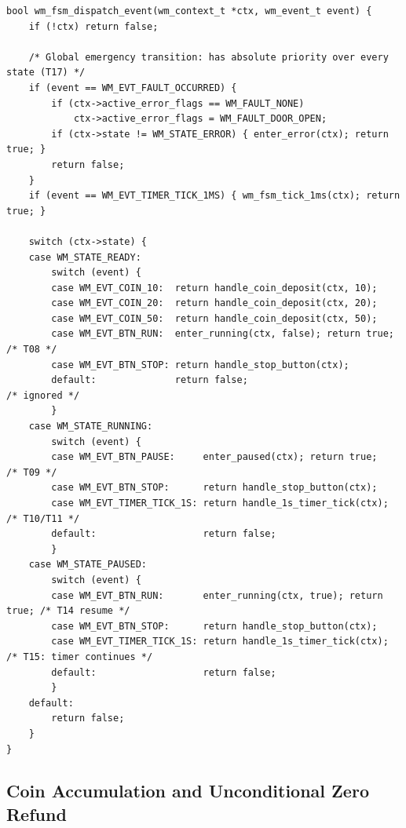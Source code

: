 \begin{lstlisting}[caption={Deterministic event dispatcher implementation}]
bool wm_fsm_dispatch_event(wm_context_t *ctx, wm_event_t event) {
    if (!ctx) return false;

    /* Global emergency transition: has absolute priority over every state (T17) */
    if (event == WM_EVT_FAULT_OCCURRED) {
        if (ctx->active_error_flags == WM_FAULT_NONE)
            ctx->active_error_flags = WM_FAULT_DOOR_OPEN;
        if (ctx->state != WM_STATE_ERROR) { enter_error(ctx); return true; }
        return false;
    }
    if (event == WM_EVT_TIMER_TICK_1MS) { wm_fsm_tick_1ms(ctx); return true; }

    switch (ctx->state) {
    case WM_STATE_READY:
        switch (event) {
        case WM_EVT_COIN_10:  return handle_coin_deposit(ctx, 10);
        case WM_EVT_COIN_20:  return handle_coin_deposit(ctx, 20);
        case WM_EVT_COIN_50:  return handle_coin_deposit(ctx, 50);
        case WM_EVT_BTN_RUN:  enter_running(ctx, false); return true;   /* T08 */
        case WM_EVT_BTN_STOP: return handle_stop_button(ctx);
        default:              return false;                             /* ignored */
        }
    case WM_STATE_RUNNING:
        switch (event) {
        case WM_EVT_BTN_PAUSE:     enter_paused(ctx); return true;      /* T09 */
        case WM_EVT_BTN_STOP:      return handle_stop_button(ctx);
        case WM_EVT_TIMER_TICK_1S: return handle_1s_timer_tick(ctx);    /* T10/T11 */
        default:                   return false;
        }
    case WM_STATE_PAUSED:
        switch (event) {
        case WM_EVT_BTN_RUN:       enter_running(ctx, true); return true; /* T14 resume */
        case WM_EVT_BTN_STOP:      return handle_stop_button(ctx);
        case WM_EVT_TIMER_TICK_1S: return handle_1s_timer_tick(ctx);    /* T15: timer continues */
        default:                   return false;
        }
    default:
        return false;
    }
}
\end{lstlisting}

\subsection{Coin Accumulation and Unconditional Zero Refund}


